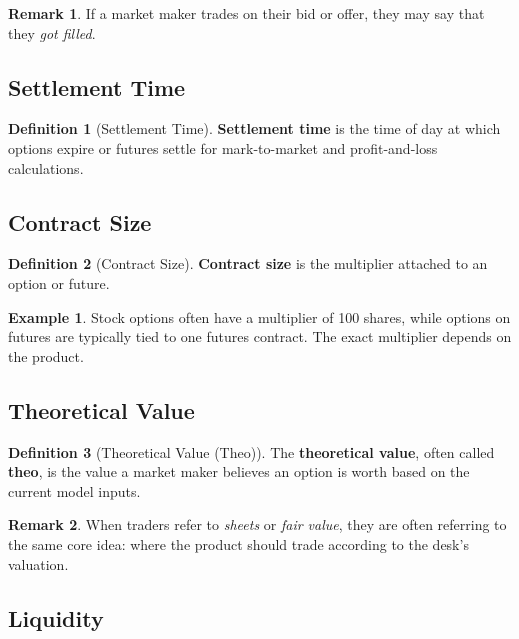 \documentclass[11pt]{article}
\theoremstyle{definition}
\newtheorem{definition}{Definition}[section]
\newtheorem{example}{Example}[section]
\newtheorem{remark}{Remark}[section]
\begin{document}
\begin{remark}
If a market maker trades on their bid or offer, they may say that they \emph{got filled}.
\end{remark}

\subsection{Settlement Time}

\begin{definition}[Settlement Time]
\textbf{Settlement time} is the time of day at which options expire or futures settle for mark-to-market and profit-and-loss calculations.
\end{definition}

\subsection{Contract Size}

\begin{definition}[Contract Size]
\textbf{Contract size} is the multiplier attached to an option or future.
\end{definition}

\begin{example}
Stock options often have a multiplier of 100 shares, while options on futures are typically tied to one futures contract. The exact multiplier depends on the product.
\end{example}

\subsection{Theoretical Value}

\begin{definition}[Theoretical Value (Theo)]
The \textbf{theoretical value}, often called \textbf{theo}, is the value a market maker believes an option is worth based on the current model inputs.
\end{definition}

\begin{remark}
When traders refer to \emph{sheets} or \emph{fair value}, they are often referring to the same core idea: where the product should trade according to the desk's valuation.
\end{remark}

\subsection{Liquidity}
\end{document}
